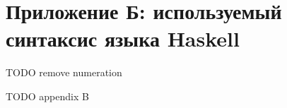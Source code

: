 \section{Приложение Б: используемый синтаксис языка Haskell}

TODO remove numeration

TODO appendix B
